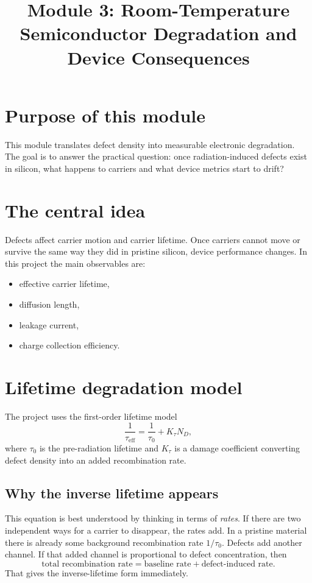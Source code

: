 \documentclass[11pt]{article}
\newcommand{\taueff}{\tau_\mathrm{eff}}
\begin{document}
\title{Module 3: Room-Temperature Semiconductor Degradation and Device Consequences}
\author{}
\date{}
\maketitle

\section{Purpose of this module}
This module translates defect density into measurable electronic degradation. The goal is to answer the practical question: once radiation-induced defects exist in silicon, what happens to carriers and what device metrics start to drift?

\section{The central idea}
Defects affect carrier motion and carrier lifetime. Once carriers cannot move or survive the same way they did in pristine silicon, device performance changes. In this project the main observables are:
\begin{itemize}
    \item effective carrier lifetime,
    \item diffusion length,
    \item leakage current,
    \item charge collection efficiency.
\end{itemize}

\section{Lifetime degradation model}
The project uses the first-order lifetime model
\begin{equation}
\frac{1}{\taueff} = \frac{1}{\tau_0} + K_\tau N_D,
\end{equation}
where $\tau_0$ is the pre-radiation lifetime and $K_\tau$ is a damage coefficient converting defect density into an added recombination rate.

\subsection{Why the inverse lifetime appears}
This equation is best understood by thinking in terms of \emph{rates}. If there are two independent ways for a carrier to disappear, the rates add. In a pristine material there is already some background recombination rate $1/\tau_0$. Defects add another channel. If that added channel is proportional to defect concentration, then
\begin{equation}
\text{total recombination rate} = \text{baseline rate} + \text{defect-induced rate}.
\end{equation}
That gives the inverse-lifetime form immediately.
\end{document}

